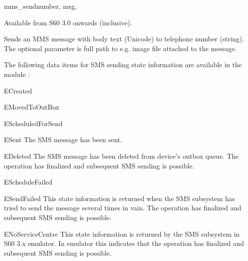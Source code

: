 \begin{funcdesc}{mms_send}{number, msg, }

\begin{notice}[note]
Available from S60 3.0 onwards (inclusive).
\end{notice}

Sends an MMS message with body text  (Unicode) to telephone number 
 (string). The optional parameter  is full path 
to e.g. image file attached to the message.

\end{funcdesc}

The following data items for SMS sending state information are available in 
the module :

\begin{datadesc}{ECreated}
\end{datadesc}

\begin{datadesc}{EMovedToOutBox}
\end{datadesc}

\begin{datadesc}{EScheduledForSend}
\end{datadesc}

\begin{datadesc}{ESent}
The SMS message has been sent.
\end{datadesc}

\begin{datadesc}{EDeleted}
The SMS message has been deleted from device's outbox queue. The 
 operation has finalized and subsequent SMS sending is possible.
\end{datadesc}

\begin{datadesc}{EScheduleFailed}
\end{datadesc}

\begin{datadesc}{ESendFailed}
This state information is returned when the SMS subsystem has tried to send the message 
several times in vain. The  operation has finalized and 
subsequent SMS sending is possible.
\end{datadesc}

\begin{datadesc}{ENoServiceCentre}
This state information is returned by the SMS subsystem in S60 3.x emulator. In 
emulator this indicates that the  operation has finalized and 
subsequent SMS sending is possible.
\end{datadesc}

